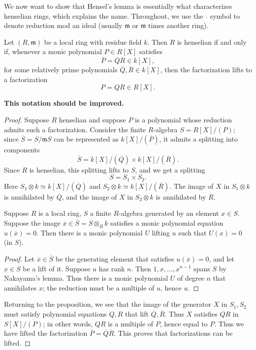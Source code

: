 We now want to show that Hensel's lemma is essentially what characterizes
henselian rings, which explains the name.
Throughout, we use the $\overline{}$ symbol to denote reduction mod an ideal
(usually $\mathfrak{m}$ or $\mathfrak{m}$ times another ring).

\begin{proposition}  \label{factorcriterion}
Let $(R, \mathfrak{m})$ be a local ring with residue field $k$. Then $R$ is henselian if and only if,
whenever a monic polynomial $P \in R[X]$ satisfies
\[ \overline{P} = \overline{Q}\overline{R} \in k[X], \]
for some relatively prime polynomials $\overline{Q}, \overline{R} \in k[X]$,
then the factorization lifts to a factorization 
\[ P = QR \in R[X].  \]
\end{proposition} 
\textbf{This notation should be improved.}
\begin{proof} 
Suppose $R$ henselian and suppose $P$ is a polynomial whose reduction admits
such a factorization.
Consider the finite $R$-algebra
\( S = R[X]/(P);  \)
since $\overline{S } = S/\mathfrak{m}S $ can be represented as
$k[X]/(\overline{P})$, it admits a splitting into components
\[ \overline{S} = k[X]/(\overline{Q}) \times k[X]/(\overline{R}).  \]
Since $R$ is henselian, this splitting lifts to $S$, and we get a splitting
\[ S = S_1 \times S_2.  \]
Here $S_1 \otimes k \simeq k[X]/(\overline{Q})$ and $S_2 \otimes k \simeq
k[X]/(\overline{R})$. 
The image of $X$ in $S_1 \otimes k$ is annihilated by $\overline{Q}$, and the
image of $X$ in $S_2 \otimes k$ is annihilated by $\overline{R}$.

\begin{lemma} 
Suppose $R$ is a local ring, $S$ a finite $R$-algebra generated
by an element $x \in S$. Suppose the image $\overline{x} \in \overline{S}=S
\otimes_R
k$ satisfies a monic polynomial equation $u(\overline{x}) = 0$. Then
there is a monic polynomial $U$ lifting $u$ such that $U(x) = 0$ (in $S$). \end{lemma} 
\begin{proof} 
Let $\overline{x} \in \overline{S}$ be the generating element that satisfies
$u(\overline{x})=0$, and let $x \in S$ be a lift of it.  Suppose $u$ has
rank $n$. Then $1, x, \dots,
x^{n-1}$ spans $S$ by Nakayama's lemma. Thus there is a monic polynomial $U$ of
degree $n$ that annihilates $x$; the reduction must be a multiple of $u$,
hence $u$.\end{proof}


Returning to the proposition, we see that the image of the generator $X$ in $S_1, S_2$ 
must satisfy polynomial equations $Q, R$ that lift $\overline{Q},
\overline{R}$. Thus $X$ satisfies $QR$ in $S[X]/(P)$; in other words, $QR$ is a
multiple of $P$, hence equal to $P$. Thus we have lifted the factorization
$\overline{P} = \overline{Q} \overline{R}$.
This proves that factorizations can be lifted.


\end{proof}
